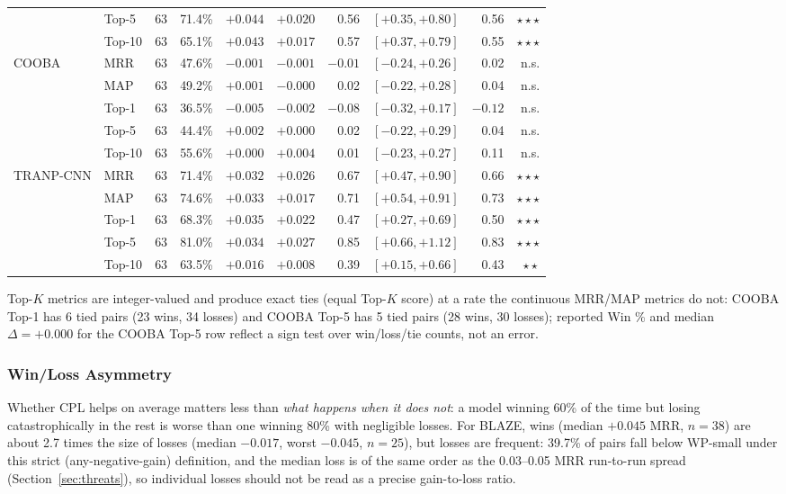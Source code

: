 \documentclass[a4paper,fleqn]{cas-dc}
\begin{document}
\begin{table}[t]
\begin{tabular}{@{}llrrrrrrrr@{}}
  & Top-5  & 63 & 71.4\% & $+0.044$ & $+0.020$ & 0.56 & $[{+}0.35,{+}0.80]$ & 0.56 & $\star\star\star$ \\
  & Top-10 & 63 & 65.1\% & $+0.043$ & $+0.017$ & 0.57 & $[{+}0.37,{+}0.79]$ & 0.55 & $\star\star\star$ \\
\midrule
\multirow{5}{*}{COOBA}
  & MRR    & 63 & 47.6\% & $-0.001$ & $-0.001$ & $-0.01$ & $[{-}0.24,{+}0.26]$ & 0.02 & n.s. \\
  & MAP    & 63 & 49.2\% & $+0.001$ & $-0.000$ & 0.02 & $[{-}0.22,{+}0.28]$ & 0.04 & n.s. \\
  & Top-1  & 63 & 36.5\% & $-0.005$ & $-0.002$ & $-0.08$ & $[{-}0.32,{+}0.17]$ & $-0.12$ & n.s. \\
  & Top-5  & 63 & 44.4\% & $+0.002$ & $+0.000$ & 0.02 & $[{-}0.22,{+}0.29]$ & 0.04 & n.s. \\
  & Top-10 & 63 & 55.6\% & $+0.000$ & $+0.004$ & 0.01 & $[{-}0.23,{+}0.27]$ & 0.11 & n.s. \\
\midrule
\multirow{5}{*}{TRANP-CNN}
  & MRR    & 63 & 71.4\% & $+0.032$ & $+0.026$ & 0.67 & $[{+}0.47,{+}0.90]$ & 0.66 & $\star\star\star$ \\
  & MAP    & 63 & 74.6\% & $+0.033$ & $+0.017$ & 0.71 & $[{+}0.54,{+}0.91]$ & 0.73 & $\star\star\star$ \\
  & Top-1  & 63 & 68.3\% & $+0.035$ & $+0.022$ & 0.47 & $[{+}0.27,{+}0.69]$ & 0.50 & $\star\star\star$ \\
  & Top-5  & 63 & 81.0\% & $+0.034$ & $+0.027$ & 0.85 & $[{+}0.66,{+}1.12]$ & 0.83 & $\star\star\star$ \\
  & Top-10 & 63 & 63.5\% & $+0.016$ & $+0.008$ & 0.39 & $[{+}0.15,{+}0.66]$ & 0.43 & $\star\star$ \\
\bottomrule
\end{tabular}
\vspace{2pt}
{\footnotesize Top-$K$ metrics are integer-valued and produce exact ties (equal Top-$K$ score) at
a rate the continuous MRR/MAP metrics do not: COOBA Top-1 has 6 tied pairs (23
wins, 34 losses) and COOBA Top-5 has 5 tied pairs (28 wins, 30 losses);
reported Win \% and median $\Delta = +0.000$ for the COOBA Top-5 row reflect a
sign test over win/loss/tie counts, not an error.}
\end{table}

\subsubsection{Win/Loss Asymmetry}

Whether CPL helps on average matters less than \emph{what happens when it
does not}: a model winning 60\% of the time but losing catastrophically in
the rest is worse than one winning 80\% with negligible losses. For BLAZE,
wins (median $+0.045$ MRR, $n = 38$) are about 2.7 times the size of losses
(median $-0.017$, worst $-0.045$, $n = 25$), but losses are frequent: 39.7\% of pairs fall
below WP-small under this strict (any-negative-gain) definition, and the
median loss is of the same order as the 0.03--0.05 MRR
run-to-run spread (Section~\ref{sec:threats}), so individual losses should not
be read as a precise gain-to-loss ratio.
\end{document}
